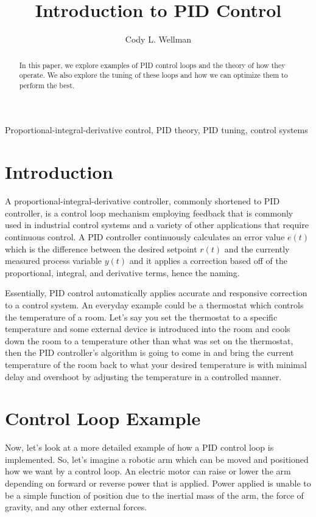 \documentclass[10pt,conference]{IEEEtran}
\begin{document}
\title{Introduction to PID Control}
\author{Cody L. Wellman}
\maketitle

\begin{abstract}
    In this paper, we explore examples of PID control loops and the theory of how they operate. We also
    explore the tuning of these loops and how we can optimize them to perform the best.
\end{abstract}

\begin{IEEEkeywords}
    Proportional-integral-derivative control, PID theory, PID tuning, control systems
\end{IEEEkeywords}

\section{Introduction}

A proportional-integral-derivative controller, commonly shortened to PID controller, is a control
loop mechanism employing feedback that is commonly used in industrial control systems and a variety
of other applications that require continuous control. A PID controller continuously calculates an
error value \(e(t)\) which is the difference between the desired setpoint \(r(t)\) and the currently
measured process variable \(y(t)\) and it applies a correction based off of the proportional, integral,
and derivative terms, hence the naming.

Essentially, PID control automatically applies accurate and responsive correction to a control system.
An everyday example could be a thermostat which controls the temperature of a room. Let's say you set
the thermostat to a specific temperature and some external device is introduced into the room and cools
down the room to a temperature other than what was set on the thermostat, then the PID controller's
algorithm is going to come in and bring the current temperature of the room back to what your desired
temperature is with minimal delay and overshoot by adjusting the temperature in a controlled manner.

\section{Control Loop Example}

Now, let's look at a more detailed example of how a PID control loop is implemented. So, let's imagine
a robotic arm\cite{b2} which can be moved and positioned how we want by a control loop. An electric motor can
raise or lower the arm depending on forward or reverse power that is applied. Power applied is unable
to be a simple function of position due to the inertial mass of the arm, the force of gravity, and
any other external forces.
\end{document}
